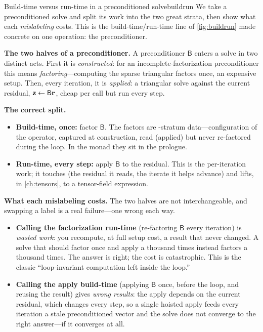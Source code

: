 \begin{workedexample}{Build-time versus run-time in a preconditioned solve}{buildrun}
We take a preconditioned solve and split its work into the two great strata,
then show what each \emph{mislabeling} costs. This is the build-time/run-time
line of \cref{fig:buildrun} made concrete on one operation: the preconditioner.

\textbf{The two halves of a preconditioner.} A preconditioner $\mathsf{B}$
enters a solve in two distinct acts. First it is \emph{constructed}: for an
incomplete-factorization preconditioner this means \emph{factoring}---computing
the sparse triangular factors once, an expensive setup. Then, every iteration, it
is \emph{applied}: a triangular solve against the current residual, $\mathbf{z} \gets
\mathsf{B}\mathbf{r}$, cheap per call but run every step.

\textbf{The correct split.}
\begin{itemize}[nosep]
  \item \textbf{Build-time, once:} factor $\mathsf{B}$. The factors are
  -stratum data---configuration of the operator, captured at
  construction, read (applied) but never re-factored during the loop. In the
  monad they sit in the  prologue.
  \item \textbf{Run-time, every step:} apply $\mathsf{B}$ to the residual. This
  is the per-iteration work; it touches  (the residual it reads,
  the iterate it helps advance) and lifts, in \cref{ch:tensors}, to a
  tensor-field expression.
\end{itemize}

\tcblower
\textbf{What each mislabeling costs.} The two halves are not interchangeable, and
swapping a label is a real failure---one wrong each way.

\begin{itemize}[nosep]
  \item \textbf{Calling the factorization run-time} (re-factoring $\mathsf{B}$
  every iteration) is \emph{wasted work}: you recompute, at full setup cost, a
  result that never changed. A solve that should factor once and apply a thousand
  times instead factors a thousand times. The answer is right; the cost is
  catastrophic. This is the classic ``loop-invariant computation left inside the
  loop.''
  \item \textbf{Calling the apply build-time} (applying $\mathsf{B}$ once, before
  the loop, and reusing the result) gives \emph{wrong results}: the apply depends
  on the current residual, which changes every step, so a single hoisted apply
  feeds every iteration a stale preconditioned vector and the solve does not
  converge to the right answer---if it converges at all.
\end{itemize}


\end{workedexample}
